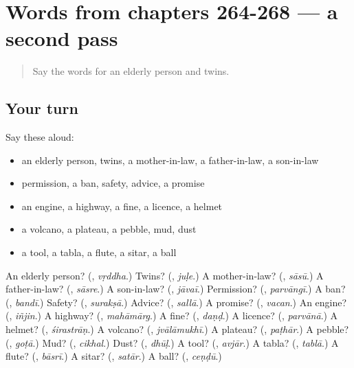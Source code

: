 \section[(dialogue)]{Words from chapters 264-268 — a second pass}

\label{lesson:MR-R268-second-pass-words-from-chapters-264-268}



\begin{quote}
Say the words for an elderly person and twins.
\end{quote}

\subsection*{Your turn}
Say these aloud:

\begin{itemize}
\raggedright
  \item an elderly person, twins, a mother-in-law, a father-in-law, a son-in-law
  \item permission, a ban, safety, advice, a promise
  \item an engine, a highway, a fine, a licence, a helmet
  \item a volcano, a plateau, a pebble, mud, dust
  \item a tool, a tabla, a flute, a sitar, a ball
\end{itemize}

\begin{tcolorbox}[breakable,colback=teal!4,colframe=teal!35!black,title={Before you move on}]
An elderly person? (\textbf{}, \emph{vṛddha}.) Twins? (\textbf{}, \emph{juḷe}.) A mother-in-law? (\textbf{}, \emph{sāsū}.) A father-in-law? (\textbf{}, \emph{sāsre}.) A son-in-law? (\textbf{}, \emph{jāvaī}.) Permission? (\textbf{}, \emph{parvāngī}.) A ban? (\textbf{}, \emph{bandī}.) Safety? (\textbf{}, \emph{surakṣā}.) Advice? (\textbf{}, \emph{sallā}.) A promise? (\textbf{}, \emph{vacan}.) An engine? (\textbf{}, \emph{iñjin}.) A highway? (\textbf{}, \emph{mahāmārg}.) A fine? (\textbf{}, \emph{daṇḍ}.) A licence? (\textbf{}, \emph{parvānā}.) A helmet? (\textbf{}, \emph{śirastrāṇ}.) A volcano? (\textbf{}, \emph{jvālāmukhī}.) A plateau? (\textbf{}, \emph{paṭhār}.) A pebble? (\textbf{}, \emph{goṭā}.) Mud? (\textbf{}, \emph{cikhal}.) Dust? (\textbf{}, \emph{dhūḷ}.) A tool? (\textbf{}, \emph{avjār}.) A tabla? (\textbf{}, \emph{tablā}.) A flute? (\textbf{}, \emph{bāsrī}.) A sitar? (\textbf{}, \emph{satār}.) A ball? (\textbf{}, \emph{ceṇḍū}.)
\end{tcolorbox}
